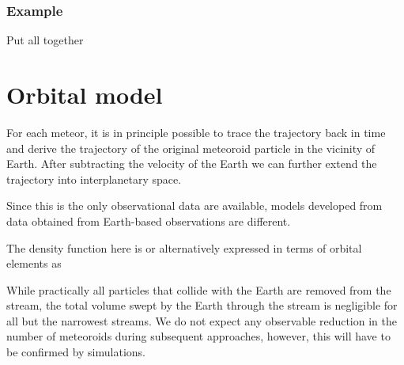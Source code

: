         \subsubsection{}

        \subsubsection{Example} \label{iove}
            Put all together


\section{Orbital model} \label{po}
    For each meteor, it is in principle possible to trace the trajectory back in time
    and derive the trajectory of the original meteoroid particle in the vicinity of Earth.
    After subtracting the velocity of the Earth we can further extend the trajectory
    into interplanetary space.

    Since this is the only observational data are available,
    models developed from data obtained from Earth-based observations are different.

    The density function here is
    or alternatively expressed in terms of orbital elements as

    While practically all particles that collide with the Earth are removed from the stream,
    the total volume swept by the Earth through the stream is negligible for all but the narrowest streams.
    We do not expect any observable reduction in the number of meteoroids during subsequent approaches,
    however, this will have to be confirmed by simulations.

